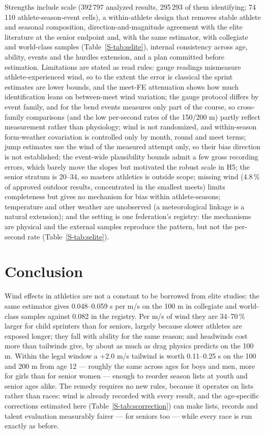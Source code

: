 \documentclass[12pt,a4paper]{article}
\begin{document}
Strengths include scale (392\,797 analyzed results, 295\,293 of them identifying; 74\,110 athlete-season-event cells), a within-athlete design that removes stable athlete and seasonal composition, direction-and-magnitude agreement with the elite literature at the senior endpoint and, with the same estimator, with collegiate and world-class samples (Table~\ref{S-tab:selite}), internal consistency across age, ability, events and the hurdles extension, and a plan committed before estimation. Limitations are stated as read rules: gauge readings mismeasure athlete-experienced wind, so to the extent the error is classical the sprint estimates are lower bounds, and the meet-FE attenuation shows how much identification leans on between-meet wind variation; the gauge protocol differs by event family, and for the bend events measures only part of the course, so cross-family comparisons (and the low per-second rates of the 150/200 m) partly reflect measurement rather than physiology; wind is not randomized, and within-season form-weather covariation is controlled only by month, round and meet terms; jump estimates use the wind of the measured attempt only, so their bias direction is not established; the event-wide plausibility bounds admit a few gross recording errors, which barely move the slopes but motivated the robust scale in H5; the senior stratum is 20--34, so masters athletics is outside scope; missing wind (4.8\,\% of approved outdoor results, concentrated in the smallest meets) limits completeness but gives no mechanism for bias within athlete-seasons; temperature and other weather are unobserved (a meteorological linkage is a natural extension); and the setting is one federation's registry: the mechanisms are physical and the external samples reproduce the pattern, but not the per-second rate (Table~\ref{S-tab:selite}).

\section{Conclusion}

Wind effects in athletics are not a constant to be borrowed from elite studies: the same estimator gives 0.048--0.059 s per m/s on the 100 m in collegiate and world-class samples against 0.082 in the registry. Per m/s of wind they are 34--70\,\% larger for child sprinters than for seniors, largely because slower athletes are exposed longer; they fall with ability for the same reason; and headwinds cost more than tailwinds give, by about as much as drag physics predicts on the 100 m. Within the legal window a +2.0 m/s tailwind is worth 0.11--0.25 s on the 100 and 200 m from age 12 --- roughly the same across ages for boys and men, more for girls than for senior women --- enough to reorder season lists at youth and senior ages alike. The remedy requires no new rules, because it operates on lists rather than races: wind is already recorded with every result, and the age-specific corrections estimated here (Table~\ref{S-tab:scorrection}) can make lists, records and talent evaluation measurably fairer --- for seniors too --- while every race is run exactly as before.
\end{document}
